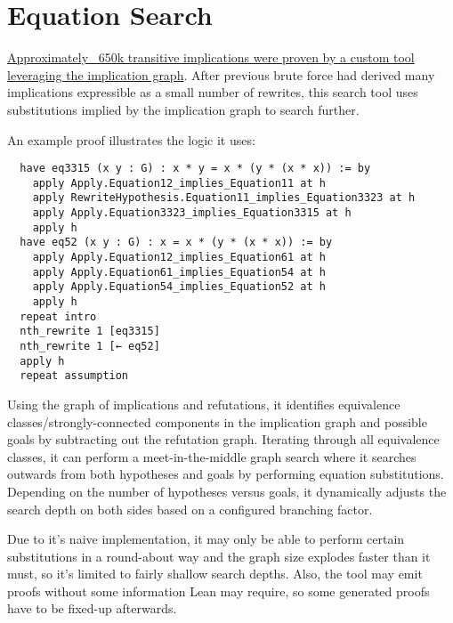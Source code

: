 \chapter{Equation Search}

\href{https://github.com/teorth/equational_theories/tree/main/equational_theories/Generated/EquationSearch}{Approximately ~650k transitive implications were proven by a custom tool leveraging the implication graph}. After previous brute force had derived many implications expressible as a small number of rewrites, this search tool uses substitutions implied by the implication graph to search further.

An example proof illustrates the logic it uses:

\begin{verbatim}
  have eq3315 (x y : G) : x * y = x * (y * (x * x)) := by
    apply Apply.Equation12_implies_Equation11 at h
    apply RewriteHypothesis.Equation11_implies_Equation3323 at h
    apply Apply.Equation3323_implies_Equation3315 at h
    apply h
  have eq52 (x y : G) : x = x * (y * (x * x)) := by
    apply Apply.Equation12_implies_Equation61 at h
    apply Apply.Equation61_implies_Equation54 at h
    apply Apply.Equation54_implies_Equation52 at h
    apply h
  repeat intro
  nth_rewrite 1 [eq3315]
  nth_rewrite 1 [← eq52]
  apply h
  repeat assumption
\end{verbatim}

Using the graph of implications and refutations, it identifies equivalence classes/strongly-connected components in the implication graph and possible goals by subtracting out the refutation graph. Iterating through all equivalence classes, it can perform a meet-in-the-middle graph search where it searches outwards from both hypotheses and goals by performing equation substitutions. Depending on the number of hypotheses versus goals, it dynamically adjusts the search depth on both sides based on a configured branching factor.

Due to it's naive implementation, it may only be able to perform certain substitutions in a round-about way and the graph size explodes faster than it must, so it's limited to fairly shallow search depths. Also, the tool may emit proofs without some information Lean may require, so some generated proofs have to be fixed-up afterwards.
